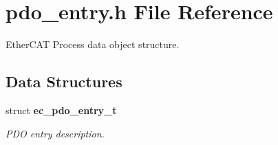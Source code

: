 \section{pdo\-\_\-entry.\-h \-File \-Reference}
\label{pdo__entry_8h}


\-Ether\-C\-A\-T \-Process data object structure.  


\subsection*{\-Data \-Structures}
\begin{DoxyCompactItemize}
\item 
struct {\bf ec\-\_\-pdo\-\_\-entry\-\_\-t}
\begin{DoxyCompactList}\small\item\em \-P\-D\-O entry description. \end{DoxyCompactList}\end{DoxyCompactItemize}
